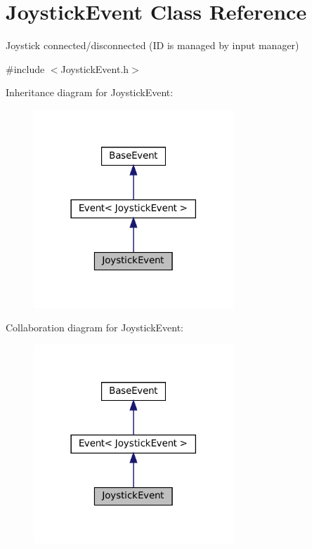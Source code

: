 \hypertarget{classJoystickEvent}{}\section{Joystick\+Event Class Reference}
\label{classJoystickEvent}


Joystick connected/disconnected (ID is managed by input manager)  




{\ttfamily \#include $<$Joystick\+Event.\+h$>$}



Inheritance diagram for Joystick\+Event\+:
\nopagebreak
\begin{figure}[H]
\begin{center}
\leavevmode
\includegraphics[width=213pt]{classJoystickEvent__inherit__graph}
\end{center}
\end{figure}


Collaboration diagram for Joystick\+Event\+:
\nopagebreak
\begin{figure}[H]
\begin{center}
\leavevmode
\includegraphics[width=213pt]{classJoystickEvent__coll__graph}
\end{center}
\end{figure}
